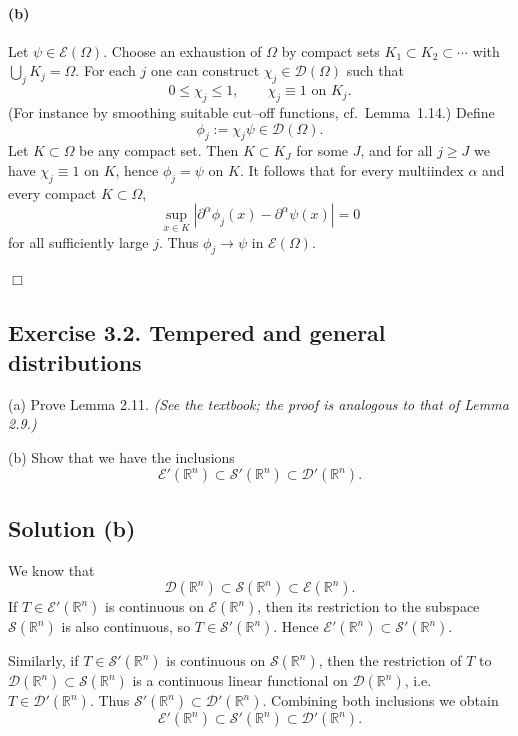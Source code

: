 \documentclass[12pt,a4paper]{article}
\theoremstyle{plain}
\theoremstyle{definition}
\theoremstyle{remark}
\theoremstyle{remark}
\begin{document}
\paragraph{(b)}
Let $\psi\in\mathcal{E}(\Omega)$. Choose an exhaustion of $\Omega$ by
compact sets $K_1\subset K_2\subset\cdots$ with
$\bigcup_{j}K_j=\Omega$. For each $j$ one can construct
$\chi_j\in\mathcal{D}(\Omega)$ such that
\[
0\le\chi_j\le 1,\qquad
\chi_j\equiv 1 \text{ on }K_j.
\]
(For instance by smoothing suitable cut--off functions, cf.\ Lemma~1.14.)
Define
\[
\phi_j := \chi_j\psi \in \mathcal{D}(\Omega).
\]
Let $K\subset\Omega$ be any compact set. Then $K\subset K_J$ for some
$J$, and for all $j\ge J$ we have $\chi_j\equiv 1$ on $K$, hence
$\phi_j=\psi$ on $K$. It follows that for every multiindex $\alpha$
and every compact $K\subset\Omega$,
\[
\sup_{x\in K}|\partial^\alpha\phi_j(x)-\partial^\alpha\psi(x)|
= 0
\]
for all sufficiently large $j$. Thus $\phi_j\to\psi$ in $\mathcal{E}(\Omega)$.

\hfill$\Box$


\subsection*{Exercise 3.2. Tempered and general distributions}

\noindent
(a)\; Prove Lemma 2.11. \emph{(See the textbook; the proof is analogous
	to that of Lemma 2.9.)}

\medskip\noindent
(b)\; Show that we have the inclusions
\[
\mathcal{E}'(\mathbb{R}^n)\subset\mathcal{S}'(\mathbb{R}^n)
\subset\mathcal{D}'(\mathbb{R}^n).
\]

\subsection*{Solution (b)}
We know that
\[
\mathcal{D}(\mathbb{R}^n)\subset\mathcal{S}(\mathbb{R}^n)
\subset\mathcal{E}(\mathbb{R}^n).
\]
If $T\in\mathcal{E}'(\mathbb{R}^n)$ is continuous on
$\mathcal{E}(\mathbb{R}^n)$, then its restriction to the subspace
$\mathcal{S}(\mathbb{R}^n)$ is also continuous, so
$T\in\mathcal{S}'(\mathbb{R}^n)$. Hence
$\mathcal{E}'(\mathbb{R}^n)\subset\mathcal{S}'(\mathbb{R}^n)$.

Similarly, if $T\in\mathcal{S}'(\mathbb{R}^n)$ is continuous on
$\mathcal{S}(\mathbb{R}^n)$, then the restriction of $T$ to
$\mathcal{D}(\mathbb{R}^n)\subset\mathcal{S}(\mathbb{R}^n)$ is a
continuous linear functional on $\mathcal{D}(\mathbb{R}^n)$, i.e.\
$T\in\mathcal{D}'(\mathbb{R}^n)$. Thus
$\mathcal{S}'(\mathbb{R}^n)\subset\mathcal{D}'(\mathbb{R}^n)$.
Combining both inclusions we obtain
\[
\mathcal{E}'(\mathbb{R}^n)\subset\mathcal{S}'(\mathbb{R}^n)
\subset\mathcal{D}'(\mathbb{R}^n).
\]
\end{document}
